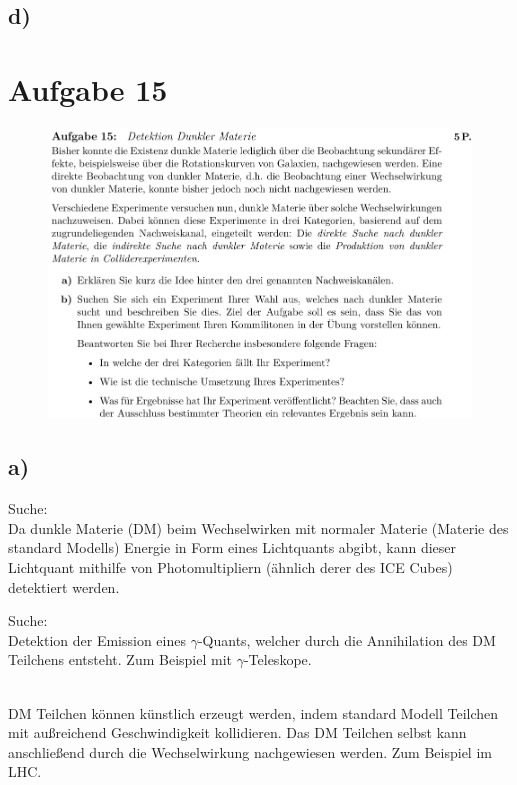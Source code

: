 \subsection{d)}


\section{Aufgabe 15}

    \begin{figure}[H]
        \centering
        \includegraphics[width=\textwidth]{images/Aufgabe15.jpg}
        \label{fig:4}
    \end{figure}

\subsection{a)}

    \justifying Suche:\\
    Da dunkle Materie (DM) beim Wechselwirken mit normaler Materie (Materie des standard Modells) Energie in Form eines Lichtquants abgibt, kann dieser Lichtquant
    mithilfe von Photomultipliern (ähnlich derer des ICE Cubes) detektiert werden.

    \justifying Suche:\\
    Detektion der Emission eines $\gamma$-Quants, welcher durch die Annihilation des DM Teilchens entsteht. Zum Beispiel mit $\gamma$-Teleskope.

    \justifying\\
    DM Teilchen können künstlich erzeugt werden, indem standard Modell Teilchen mit außreichend Geschwindigkeit kollidieren. Das DM Teilchen selbst kann anschließend
    durch die Wechselwirkung nachgewiesen werden. Zum Beispiel im LHC.

